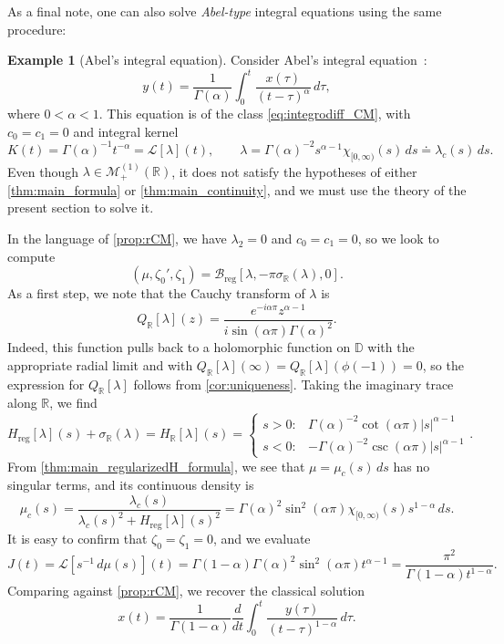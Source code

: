 \documentclass{cams-l} %
\newcommand{\dave}[1]{#1}\newcommand{\davebegin}{}\newcommand{\daveend}{}\newcommand{\george}[1]{#1}
\newcommand{\RR}{\mathbb R}
\newcommand{\DD}{\mathbb D}
\newcommand{\cL}{\mathcal L}
\newcommand{\cM}{\mathcal M}
\newcommand{\cB}{\mathcal B}
\theoremstyle{definition}
\newtheorem{example}[theorem]{Example}
\theoremstyle{remark}
\numberwithin{equation}{section}
\begin{document}
As a final note, one can also solve \emph{Abel-type} integral equations using the same procedure:
\begin{example}[Abel's integral equation]\label{ex:abeltype}
    \dave{Consider Abel's integral equation}~\cite{BRUNNER199783}:
    \begin{equation}\label{eq:abeltypeeq}
        y(t) = \frac{1}{\Gamma(\alpha)}\int_0^t\frac{x(\tau)}{(t-\tau)^{\alpha}}\,d\tau,
    \end{equation}
    where $0<\alpha<1$. This equation is of the class \ref{eq:integrodiff_CM}, with $c_0=c_1=0$ and integral kernel
    \[K(t) = \Gamma(\alpha)^{-1}t^{-\alpha} = \cL[\lambda](t),\qquad \lambda = \Gamma(\alpha)^{-2}s^{\alpha-1}\chi_{[0,\infty)}(s)\,ds \doteq \lambda_c(s)\,ds.\]
    Even though $\lambda\in\cM_+^{(1)}(\RR)$, it does not satisfy the hypotheses of either \cref{thm:main_formula} or \cref{thm:main_continuity}, and we must use the theory of the present section to solve it.

    In the language of \cref{prop:rCM}, we have $\lambda_2=0$ and $c_0=c_1=0$, so we look to compute
    \[(\mu,\zeta_0',\zeta_1) = \cB_\mathrm{reg}[\lambda,-\pi\sigma_\RR(\lambda),0].\]
    As a first step, we note that the Cauchy transform of $\lambda$ is
    \[Q_\RR[\lambda](z) = \frac{e^{-i\alpha\pi} z^{\alpha-1}}{i\sin(\alpha\pi)\Gamma(\alpha)^2}.\]
    Indeed, this function pulls back to a holomorphic function on $\DD$ with the appropriate radial limit and with $Q_\RR[\lambda](\infty) = Q_\RR[\lambda](\phi(-1)) = 0$, so \dave{the expression for $Q_\RR[\lambda]$} follows from \cref{cor:uniqueness}. Taking the imaginary trace along $\RR$, we find
    \[H_\mathrm{reg}[\lambda](s) +\sigma_\RR(\lambda) = H_\RR[\lambda](s) = \begin{cases}
        s>0: & \Gamma(\alpha)^{-2}\cot(\alpha\pi)|s|^{\alpha-1}\\
        s<0: & -\Gamma(\alpha)^{-2}\csc(\alpha\pi)|s|^{\alpha-1}
    \end{cases}.\]
    From \cref{thm:main_regularizedH_formula}, we see that $\mu = \mu_c(s)\,ds$ has no singular terms, and its continuous density is
    \[\mu_c(s) = \frac{\lambda_c(s)}{\lambda_c(s)^2 + H_\mathrm{reg}[\lambda](s)^2} = \Gamma(\alpha)^2\sin^2(\alpha\pi)\chi_{[0,\infty)}(s) s^{1-\alpha}\,ds.\]
    It is easy to confirm that $\zeta_0=\zeta_1=0$, and we evaluate
    \[J(t) = \cL[s^{-1}\,d\mu(s)](t) = \Gamma(1-\alpha)\Gamma(\alpha)^2\sin^2(\alpha\pi) t^{\alpha-1} = \frac{\pi^2}{\Gamma(1-\alpha)t^{1-\alpha}}.\]
    Comparing against \cref{prop:rCM}, we recover the classical solution
    \[x(t) = \frac{1}{\Gamma(1-\alpha)}\frac{d}{dt}\int_0^t\frac{y(\tau)}{(t-\tau)^{1-\alpha}}\,d\tau.\]
\end{example}
\end{document}
